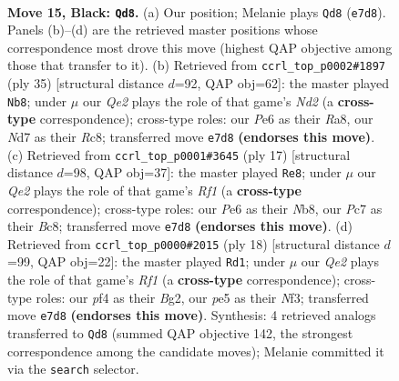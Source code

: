 \documentclass[11pt]{article}
\begin{document}
\clearpage

\begin{figure}[p]\centering
\begin{subfigure}{0.46\textwidth}\centering
\resizebox{\linewidth}{!}{%
\newchessgame
\chessboard[
  setfen={rnb1r3/2pnqkpp/pp2p3/3pPp2/3P1P1P/6Q1/PPPKN1P1/1R3BNR b - - 5 15},
  showmover=false,
  pgfstyle=straightmove, color=movearrow, markmove={e7-d8}
]}
\caption{}
\end{subfigure}\hfill
\begin{subfigure}{0.46\textwidth}\centering
\resizebox{\linewidth}{!}{%
\newchessgame
\chessboard[
  setfen={r1r2nk1/pp1nbpp1/1q2p2p/3pP3/P2P3P/3Q1NP1/1PN2PK1/R1BR4 b - - 4 18},
  showmover=false,
  pgfstyle=straightmove, color=movearrow, markmove={d7-b8}
]}
\caption{}
\end{subfigure}
\\[4pt]
\begin{subfigure}{0.46\textwidth}\centering
\resizebox{\linewidth}{!}{%
\newchessgame
\chessboard[
  setfen={rnbq1rk1/pp3pbp/3p1np1/2pP4/4P3/2NB4/PP1N1PPP/R1BQK2R b KQ - 1 9},
  showmover=false,
  pgfstyle=straightmove, color=movearrow, markmove={f8-e8}
]}
\caption{}
\end{subfigure}\hfill
\begin{subfigure}{0.46\textwidth}\centering
\resizebox{\linewidth}{!}{%
\newchessgame
\chessboard[
  setfen={rn1qk2r/pb1p1ppp/1p2pn2/8/2Pp4/5NP1/PPQ1PPBP/RN3RK1 w kq - 0 10},
  showmover=false,
  pgfstyle=straightmove, color=movearrow, markmove={f1-d1}
]}
\caption{}
\end{subfigure}
\caption{\textbf{Move 15, Black: \texttt{Qd8}.} (a) Our position; Melanie plays \texttt{Qd8} (\texttt{e7d8}). Panels (b)--(d) are the retrieved master positions whose correspondence most drove this move (highest QAP objective among those that transfer to it). (b) Retrieved from \texttt{ccrl\_top\_p0002\#1897} (ply 35) [structural distance $d$=92, QAP obj=62]: the master played \texttt{Nb8}; under $\mu$ our \emph{Qe2} plays the role of that game's \emph{Nd2} (a \textbf{cross-type} correspondence); cross-type roles: our \emph{P}e6 as their \emph{R}a8, our \emph{N}d7 as their \emph{R}c8; transferred move \texttt{e7d8} \textbf{(endorses this move)}. (c) Retrieved from \texttt{ccrl\_top\_p0001\#3645} (ply 17) [structural distance $d$=98, QAP obj=37]: the master played \texttt{Re8}; under $\mu$ our \emph{Qe2} plays the role of that game's \emph{Rf1} (a \textbf{cross-type} correspondence); cross-type roles: our \emph{P}e6 as their \emph{N}b8, our \emph{P}c7 as their \emph{B}c8; transferred move \texttt{e7d8} \textbf{(endorses this move)}. (d) Retrieved from \texttt{ccrl\_top\_p0000\#2015} (ply 18) [structural distance $d$=99, QAP obj=22]: the master played \texttt{Rd1}; under $\mu$ our \emph{Qe2} plays the role of that game's \emph{Rf1} (a \textbf{cross-type} correspondence); cross-type roles: our \emph{p}f4 as their \emph{B}g2, our \emph{p}e5 as their \emph{N}f3; transferred move \texttt{e7d8} \textbf{(endorses this move)}. Synthesis: 4 retrieved analogs transferred to \texttt{Qd8} (summed QAP objective 142, the strongest correspondence among the candidate moves); Melanie committed it via the \texttt{search} selector.}
\label{fig:thought-m29}
\end{figure}
\end{document}

